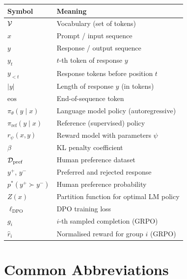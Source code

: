 \begin{center}
\begin{tabular}{@{}ll@{}}
\toprule
\textbf{Symbol} & \textbf{Meaning} \\
\midrule
$\mathcal{V}$                    & Vocabulary (set of tokens) \\
$x$                      & Prompt / input sequence \\
$y$                      & Response / output sequence \\
$y_t$                    & $t$-th token of response $y$ \\
$y_{<t}$                 & Response tokens before position $t$ \\
$|y|$                    & Length of response $y$ (in tokens) \\
$\mathrm{eos}$           & End-of-sequence token \\
$\pi_\theta(y\mid x)$    & Language model policy (autoregressive) \\
$\pi_\mathrm{ref}(y\mid x)$ & Reference (supervised) policy \\
$r_\psi(x,y)$            & Reward model with parameters $\psi$ \\
$\beta$                  & KL penalty coefficient \\
$\mathcal{D}_\mathrm{pref}$      & Human preference dataset \\
$y^+$, $y^-$             & Preferred and rejected response \\
$p^*(y^+\succ y^-)$      & Human preference probability \\
$Z(x)$                   & Partition function for optimal LM policy \\
$\ell_\mathrm{DPO}$      & DPO training loss \\
$g_i$                    & $i$-th sampled completion (GRPO) \\
$\hat{r}_i$              & Normalised reward for group $i$ (GRPO) \\
\bottomrule
\end{tabular}
\end{center}

\section*{Common Abbreviations}

